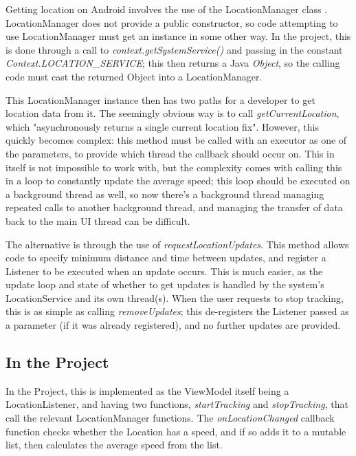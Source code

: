 \documentclass[11pt, a4paper, notitlepage]{report}
\begin{document}
Getting location on Android involves the use of the LocationManager class \citep{locationAndroid}. LocationManager does not provide a public constructor, so code attempting to use LocationManager must get an instance in some other way. In the project, this is done through a call to \textit{context.getSystemService()} and passing in the constant \textit{Context.LOCATION\_SERVICE}; this then returns a Java \textit{Object}, so the calling code must cast the returned Object into a LocationManager.

This LocationManager instance then has two paths for a developer to get location data from it. The seemingly obvious way is to call \textit{getCurrentLocation}, which "asynchronously returns a single current location fix". However, this quickly becomes complex: this method must be called with an executor as one of the parameters, to provide which thread the callback should occur on. This in itself is not impossible to work with, but the complexity comes with calling this in a loop to constantly update the average speed; this loop should be executed on a background thread as well, so now there's a background thread managing repeated calls to another background thread, and managing the transfer of data back to the main UI thread can be difficult.

The alternative is through the use of \textit{requestLocationUpdates}. This method allows code to specify minimum distance and time between updates, and register a Listener to be executed when an update occurs. This is much easier, as the update loop and state of whether to get updates is handled by the system's LocationService and its own thread(s). When the user requests to stop tracking, this is as simple as calling \textit{removeUpdates}; this de-registers the Listener passed as a parameter (if it was already registered), and no further updates are provided.

\subsection{In the Project}
In the Project, this is implemented as the ViewModel itself being a LocationListener, and having two functions, \textit{startTracking} and \textit{stopTracking}, that call the relevant LocationManager functions. The \textit{onLocationChanged} callback function checks whether the Location has a speed, and if so adds it to a mutable list, then calculates the average speed from the list.
\end{document}
